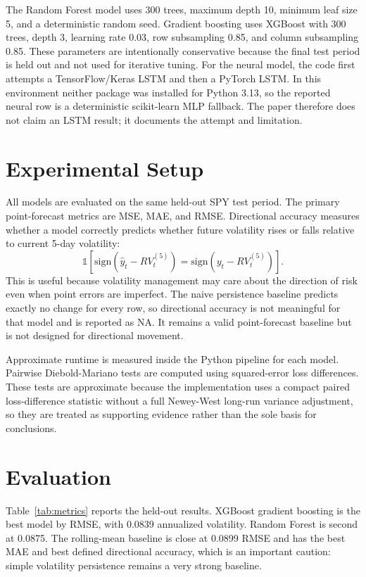 \documentclass{article}
\begin{document}
The Random Forest model uses 300 trees, maximum depth 10, minimum leaf size 5, and a deterministic random seed. Gradient boosting uses XGBoost with 300 trees, depth 3, learning rate 0.03, row subsampling 0.85, and column subsampling 0.85. These parameters are intentionally conservative because the final test period is held out and not used for iterative tuning. For the neural model, the code first attempts a TensorFlow/Keras LSTM and then a PyTorch LSTM. In this environment neither package was installed for Python 3.13, so the reported neural row is a deterministic scikit-learn MLP fallback. The paper therefore does not claim an LSTM result; it documents the attempt and limitation.

\section{Experimental Setup}
All models are evaluated on the same held-out SPY test period. The primary point-forecast metrics are MSE, MAE, and RMSE. Directional accuracy measures whether a model correctly predicts whether future volatility rises or falls relative to current 5-day volatility:
\[
\mathbb{1}\left[\mathrm{sign}(\hat{y}_t - RV^{(5)}_t)=\mathrm{sign}(y_t - RV^{(5)}_t)\right].
\]
This is useful because volatility management may care about the direction of risk even when point errors are imperfect. The naive persistence baseline predicts exactly no change for every row, so directional accuracy is not meaningful for that model and is reported as NA. It remains a valid point-forecast baseline but is not designed for directional movement.

Approximate runtime is measured inside the Python pipeline for each model. Pairwise Diebold-Mariano tests are computed using squared-error loss differences. These tests are approximate because the implementation uses a compact paired loss-difference statistic without a full Newey-West long-run variance adjustment, so they are treated as supporting evidence rather than the sole basis for conclusions.

\section{Evaluation}
Table~\ref{tab:metrics} reports the held-out results. XGBoost gradient boosting is the best model by RMSE, with 0.0839 annualized volatility. Random Forest is second at 0.0875. The rolling-mean baseline is close at 0.0899 RMSE and has the best MAE and best defined directional accuracy, which is an important caution: simple volatility persistence remains a very strong baseline.
\end{document}
